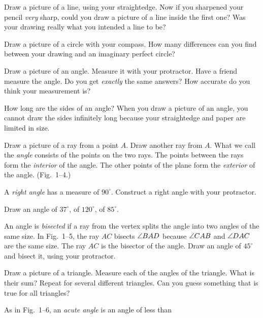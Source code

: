 \documentclass[11pt]{book}
\begin{document}
\begin{exercisecols}
\begin{exlist}
\item Draw a picture of a line, using your straightedge. Now if you sharpened
      your pencil \emph{very} sharp, could you draw a picture of a line inside the
      first one? Was your drawing really what you intended a line to be?
\item Draw a picture of a circle with your compass. How many differences can you
      find between your drawing and an imaginary perfect circle?
\item Draw a picture of an angle. Measure it with your protractor. Have a friend
      measure the angle. Do you get \emph{exactly} the same answers? How accurate
      do you think your measurement is?
\item How long are the sides of an angle? When you draw a picture of an angle,
      you cannot draw the sides infinitely long because your straightedge and
      paper are limited in size.
\item Draw a picture of a ray from a point $A$. Draw another ray from $A$. What
      we call the \emph{angle} consists of the points on the two rays. The points
      between the rays form the \emph{interior} of the angle. The other points of
      the plane form the \emph{exterior} of the angle. (Fig.~1--4.)
\exfig{\FIGIFOUR}
\item A \emph{right angle} has a measure of $90^\circ$. Construct a right angle
      with your protractor.
\item Draw an angle of $37^\circ$, of $120^\circ$, of $85^\circ$.
\item An angle is \emph{bisected} if a ray from the vertex splits the angle into
      two angles of the same size. In Fig.~1--5, the ray $AC$ bisects
      $\angle BAD$ because $\angle CAB$ and $\angle DAC$ are the same size. The ray
      $AC$ is the bisector of the angle. Draw an angle of $45^\circ$ and bisect
      it, using your protractor.
\exfig{\FIGIFIVE}
\item Draw a picture of a triangle. Measure each of the angles of the triangle.
      What is their sum? Repeat for several different triangles. Can you guess
      something that is true for all triangles?
\item As in Fig.~1--6, an \emph{acute angle} is an angle of less than

\end{exlist}
\end{exercisecols}
\end{document}
